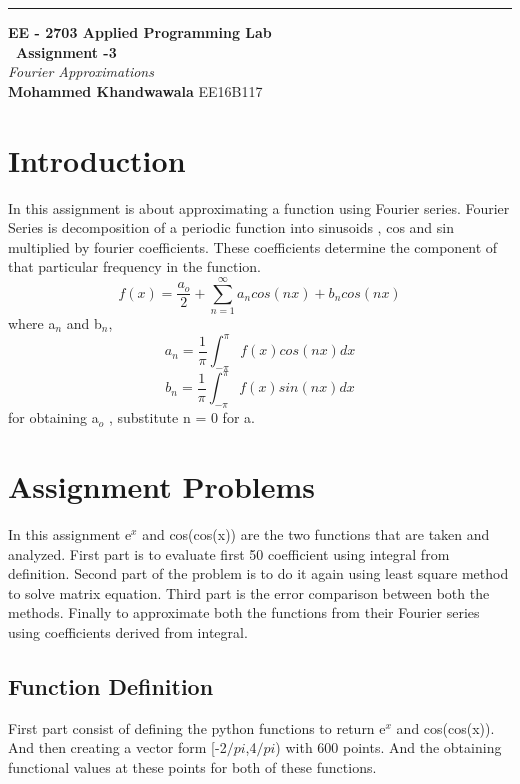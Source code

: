\documentclass[a4paper]{article}
\begin{document}
\begin{titlepage}
	\raggedleft
	\rule{1pt}{\textheight} 
	\hspace{0.05\textwidth} 
	\parbox[b]{0.75\textwidth}{		
		{\LARGE\bfseries EE - 2703 Applied Programming Lab \\[0.5\baselineskip]  ~\huge Assignment -3}\\[2\baselineskip] 
		{\large\textit{Fourier Approximations}}\\[4\baselineskip] 
		{\Large\textbf{Mohammed Khandwawala}}
        \large EE16B117
		\vspace{0.5\textheight}  
	}

\end{titlepage}


\tableofcontents


\section{Introduction}

In this assignment is about approximating a function using Fourier series.
Fourier Series is decomposition of a periodic function into sinusoids , cos and sin multiplied by fourier coefficients. These coefficients determine the component of that particular frequency in the function.   
$$ f(x) = \frac{a_{o}}{2} + \sum_{n=1}^{\infty} a_{n}cos(nx) + b_{n}cos(nx) $$
where a$_{n}$ and b$_{n}$,
$$ a_{n} = \frac{1}{\pi} \int_{-\pi}^{\pi} f(x)cos(nx) dx $$
$$ b_{n} = \frac{1}{\pi} \int_{-\pi}^{\pi} f(x)sin(nx) dx $$
for obtaining a$_{o}$ , substitute n = 0 for a. 
\section{Assignment Problems}

In this assignment e$^{x}$ and cos(cos(x)) are the two functions that are taken and analyzed. First part is to evaluate first 50 coefficient using integral from definition.
Second part of the problem is to do it again using least square method to solve matrix equation. Third part is the error comparison between both the methods. Finally to approximate both the functions from their Fourier series using coefficients derived from integral.   

\subsection{Function Definition}

First part consist of defining the python functions to return e$^{x}$ and cos(cos(x)). And then creating a vector form [-2$/pi$,4$/pi$) with 600 points. And the obtaining functional values at these points for both of these functions.
\end{document}
